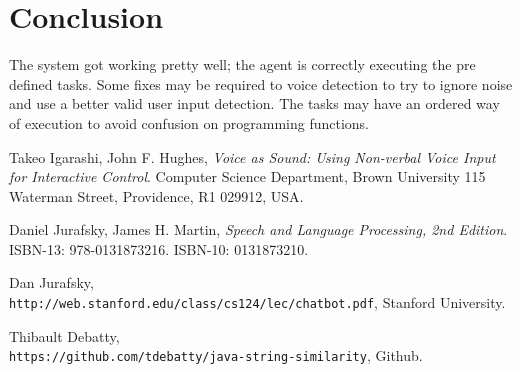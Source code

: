 \documentclass[
	article,			%
	11pt,				%
	oneside,			%
	a4paper,			%
	english,			%
	english,				%
	]{abntex2}
\begin{document}
\section{Conclusion}

The system got working pretty well; the agent is correctly executing the pre defined tasks.
Some fixes may be required to voice detection to try to ignore noise and use a better valid
user input detection. The tasks may have an ordered way of execution to avoid confusion on
programming functions.

\medskip




\begin{thebibliography}{9}

Takeo Igarashi, John F. Hughes, 
\textit{Voice as Sound: Using Non-verbal Voice Input for Interactive Control}. 
Computer Science Department, Brown University 115 Waterman Street, Providence, R1 029912, USA.
 
Daniel Jurafsky, James H. Martin, 
\textit{Speech and Language Processing, 2nd Edition}.
ISBN-13: 978-0131873216.
ISBN-10: 0131873210.
 
Dan	Jurafsky, 
\\\texttt{http://web.stanford.edu/class/cs124/lec/chatbot.pdf},
Stanford University.

Thibault Debatty, 
\\\texttt{https://github.com/tdebatty/java-string-similarity},
Github.

\end{thebibliography}
 
\end{document}
